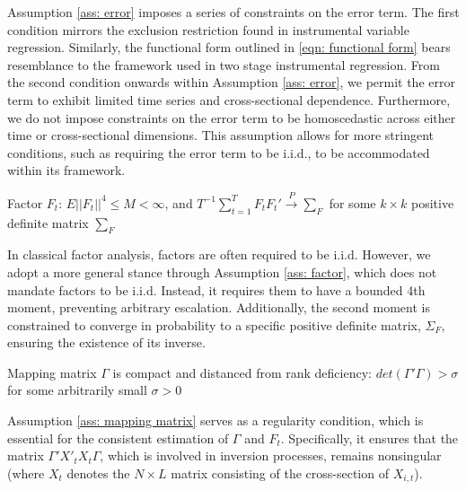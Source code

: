 \documentclass[12pt]{article}
\begin{document}
Assumption \ref{ass: error} imposes a series of constraints on the error term. The first condition mirrors the exclusion restriction found in instrumental variable regression. Similarly, the functional form outlined in \ref{eqn: functional form} bears resemblance to the framework used in two stage instrumental regression. From the second condition onwards within Assumption \ref{ass: error}, we permit the error term to exhibit limited time series and cross-sectional dependence. Furthermore, we do not impose constraints on the error term to be homoscedastic across either time or cross-sectional dimensions. This assumption allows for more stringent conditions, such as requiring the error term to be i.i.d., to be accommodated within its framework.

\begin{assumption}
\label{ass: factor}
Factor $F_{t}$: $E||F_t||^4 \leq M < \infty$, and $T^{-1}\sum_{t=1}^TF_t F_t' \xrightarrow{P} \sum_{F}$ for some $k \times k$ positive definite matrix $\sum_{F}$
\end{assumption}

In classical factor analysis, factors are often required to be i.i.d. However, we adopt a more general stance through Assumption \ref{ass: factor}, which does not mandate factors to be i.i.d. Instead, it requires them to have a bounded 4th moment, preventing arbitrary escalation. Additionally, the second moment is constrained to converge in probability to a specific positive definite matrix, $\Sigma_F$, ensuring the existence of its inverse.

\begin{assumption}
\label{ass: mapping matrix}
Mapping matrix $\Gamma$ is compact and distanced from rank deficiency: $det \left(\Gamma' \Gamma \right) > \sigma$ for some arbitrarily small $\sigma > 0$
\end{assumption}

Assumption \ref{ass: mapping matrix} serves as a regularity condition, which is essential for the consistent estimation of $\Gamma$ and $F_t$. Specifically, it ensures that the matrix $\Gamma'X'_tX_t\Gamma$, which is involved in inversion processes, remains nonsingular (where $X_t$ denotes the $N \times L$ matrix consisting of the cross-section of $X_{i,t}$).
\end{document}
